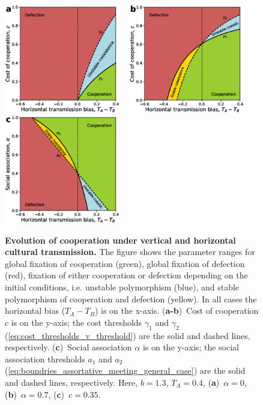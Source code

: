 \documentclass[12pt]{extarticle}
\begin{document}

\begin{figure}[p]
  \centering       
    \includegraphics[width=0.45\textwidth]{Result2_c_zero_alpha.eps}
	~
    \includegraphics[width=0.45\textwidth]{Result2_c_non_zero_alpha.eps}
    ~
    \includegraphics[width=0.45\textwidth]{Result2_alpha.eps}

    \caption{\textbf{Evolution of cooperation under vertical and horizontal cultural transmission.} 
The figure shows the parameter ranges for global fixation of cooperation (green), global fixation of defection (red), fixation of either cooperation or defection depending on the initial conditions, i.e. unstable polymorphism (blue), and stable polymorphism of cooperation and defection (yellow).
In all cases the horizontal bias ($T_A-T_B$) is on the x-axis.
(\textbf{a-b})~Cost of cooperation $c$ is on the y-axis; the cost thresholds $\gamma_1$ and $\gamma_2$ (\autoref{eq:cost_thresholds_v_threshold}) are the solid and dashed lines, respectively. 
(\textbf{c})~Social association $\alpha$ is on the y-axis; the social association thresholds $a_1$ and $a_2$ (\autoref{eq:boundries_assortative_meeting_general_case}) are the solid and dashed lines, respectively.
Here, $b=1.3$, $T_A=0.4$, (\textbf{a})~$\alpha = 0$,(\textbf{b})~$\alpha = 0.7$, (\textbf{c})~$c = 0.35$.
  	}
    \label{fig:result2}
\end{figure}
\end{document}
